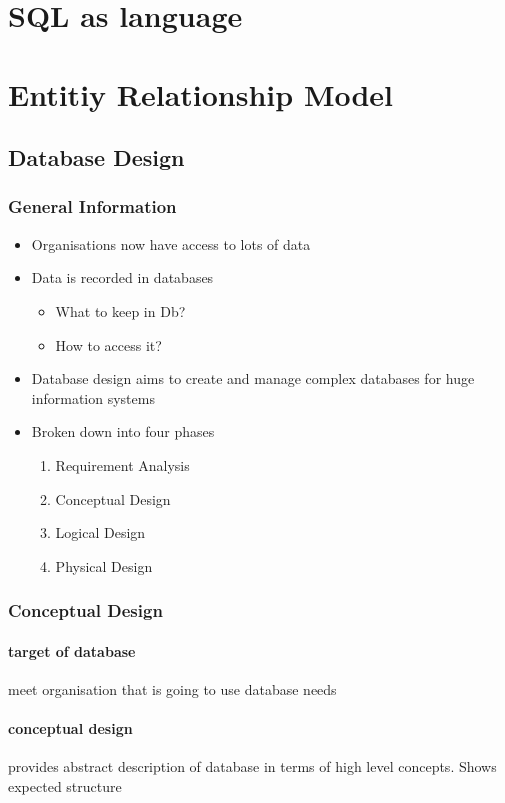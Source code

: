 \documentclass{article}
\begin{document}


\section{SQL as language}

\section{Entitiy Relationship Model}
	\subsection{Database Design}
		\subsubsection{General Information}
			\begin{itemize}
				\item Organisations now have access to lots of data
				\item Data is recorded in databases
					\begin{itemize}
						\item What to keep in Db?
						\item How to access it?
					\end{itemize}
				\item Database design aims to create and manage complex databases for huge information systems
				\item Broken down into four phases
					\begin{enumerate}
						\item Requirement Analysis
						\item Conceptual Design
						\item Logical Design
						\item Physical Design
					\end{enumerate}
			\end{itemize}

		\subsubsection{Conceptual Design}
			\paragraph{target of database} meet organisation that is going to use database needs
			\paragraph{conceptual design} provides abstract description of database in terms of high level concepts. Shows expected structure
\end{document}
